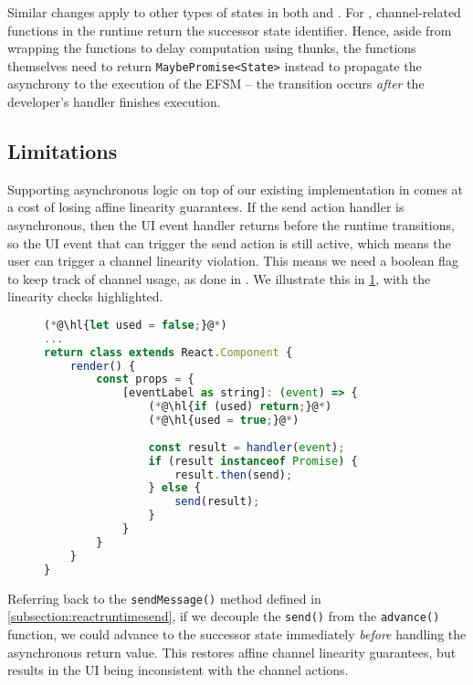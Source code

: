 Similar changes apply to other types of states in both
 and .
For , channel-related functions in the runtime
return the successor state identifier. Hence, aside from
wrapping the functions to delay computation using thunks,
the functions themselves need to
return \texttt{MaybePromise<State>} instead
to propagate the asynchrony
to the execution of the EFSM -- the transition occurs
\textit{after} the developer's handler finishes execution.

\subsection{Limitations}
\label{subsection:asynclimit}

Supporting asynchronous logic on top of our
existing implementation in  comes at a cost
of losing affine linearity guarantees.
If the send action handler is asynchronous, then the UI event handler
returns before the runtime transitions, so the UI event that can trigger
the send action is still active, which means the user can trigger
a channel linearity violation. This means we need a boolean flag
to keep track of channel usage, as done in \cite{Hybrid2016}.
We illustrate this in \cref{lst:asynclinearcheck},
with the linearity checks highlighted.

\begin{figure}[!h]
\begin{lstlisting}[language=javascript]
(*@\hl{let used = false;}@*)
...
return class extends React.Component {
	render() {
		const props = {
			[eventLabel as string]: (event) => {
				(*@\hl{if (used) return;}@*)
				(*@\hl{used = true;}@*)
				
				const result = handler(event);
				if (result instanceof Promise) {
					result.then(send);
				} else {
					send(result);
				}
			}		
		}
	}
}
\end{lstlisting}
\label{lst:asynclinearcheck}
\end{figure}

Referring back to the \texttt{sendMessage()} method
defined in \cref{subsection:reactruntimesend},
if we decouple the \texttt{send()} 
from the \texttt{advance()} function, we could advance to the successor state
immediately \textit{before} handling the asynchronous return value.
This restores affine channel linearity guarantees, but 
results in the UI being inconsistent with the channel
actions.